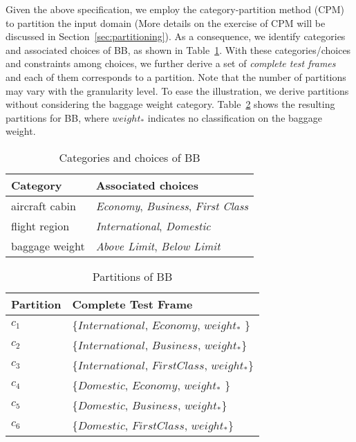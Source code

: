 \documentclass[10pt,journal,compsoc]{IEEEtran}
\begin{document}
Given the above specification, we employ the category-partition method (CPM)~\cite{Ostrand88} to partition the input domain (More details on the exercise of CPM will be discussed in Section~\ref{sec:partitioning}). As a consequence, we identify categories and associated choices of BB, as shown in Table~\ref{table:categoryAndchoice}. With these categories/choices and constraints among choices, we further derive a set of \emph{complete test frames} and each of them corresponds to a partition. Note that the number of partitions may vary with the granularity level. To ease the illustration, we derive partitions without considering the baggage weight category. Table~\ref{table:partitionrule} shows the resulting partitions for BB, where $weight_*$ indicates no classification on the baggage weight.

\begin{table}
  \caption{Categories and choices of BB}
  \label{table:categoryAndchoice}
  \centering
  \begin{tabular}{ll}
  \toprule
  Category                    & Associated choices \\
  \midrule
   aircraft cabin             & \emph{Economy}, \emph{Business}, \emph{First Class} \\
   flight region              & \emph{International}, \emph{Domestic} \\
   baggage weight             & \emph{Above Limit}, \emph{Below Limit} \\
  \bottomrule
  \end{tabular}
\end{table}

\begin{table}
  \caption{Partitions of BB}
  \label{table:partitionrule}
  \centering
  \begin{tabular}{|l|l|} \hline
  Partition       & Complete Test Frame \\ \hline
  $c_1$  & \{$International$, $Economy$, $weight_*$ \} \\ \hline
  $c_2$  & \{$International$, $Business$, $weight_*$\} \\ \hline
  $c_3$  & \{$International$, $First Class$, $weight_*$\} \\ \hline
  $c_4$  & \{$Domestic$, $Economy$, $weight_*$ \} \\ \hline
  $c_5$  & \{$Domestic$, $Business$, $weight_*$\} \\ \hline
  $c_6$  & \{$Domestic$, $First Class$, $weight_*$\} \\ \hline
  \end{tabular}
\end{table}
\end{document}
